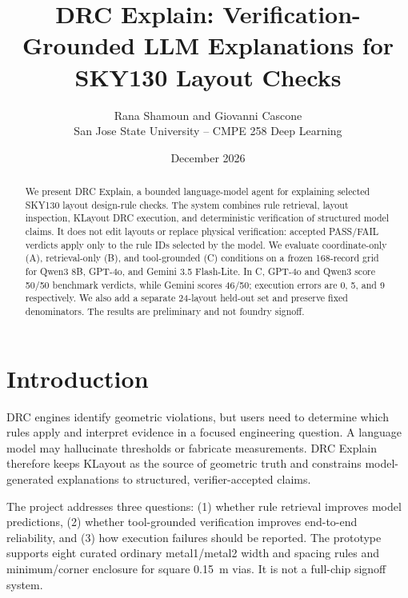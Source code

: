 \documentclass[10pt,twocolumn]{article}
\title{DRC Explain: Verification-Grounded LLM Explanations for SKY130 Layout Checks}
\author{Rana Shamoun and Giovanni Cascone\\
San Jose State University -- CMPE 258 Deep Learning}
\date{December 2026}
\begin{document}
\maketitle

\begin{abstract}
We present DRC Explain, a bounded language-model agent for explaining selected SKY130
layout design-rule checks. The system combines rule retrieval, layout inspection,
KLayout DRC execution, and deterministic verification of structured model claims.
It does not edit layouts or replace physical verification: accepted PASS/FAIL verdicts
apply only to the rule IDs selected by the model. We evaluate coordinate-only (A),
retrieval-only (B), and tool-grounded (C) conditions on a frozen 168-record grid for
Qwen3 8B, GPT-4o, and Gemini 3.5 Flash-Lite. In C, GPT-4o and Qwen3 score 50/50
benchmark verdicts, while Gemini scores 46/50; execution errors are 0, 5, and 9
respectively. We also add a separate 24-layout held-out set and preserve fixed
denominators. The results are preliminary and not foundry signoff.
\end{abstract}

\section{Introduction}
DRC engines identify geometric violations, but users need to determine which rules
apply and interpret evidence in a focused engineering question. A language model may
hallucinate thresholds or fabricate measurements. DRC Explain therefore keeps
KLayout as the source of geometric truth and constrains model-generated explanations
to structured, verifier-accepted claims.

The project addresses three questions: (1) whether rule retrieval improves model
predictions, (2) whether tool-grounded verification improves end-to-end reliability,
and (3) how execution failures should be reported. The prototype supports eight
curated ordinary metal1/metal2 width and spacing rules and minimum/corner enclosure
for square 0.15~\textmu m vias. It is not a full-chip signoff system.
\end{document}
